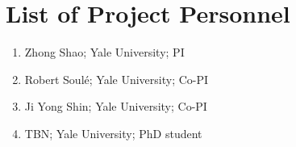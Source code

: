 \documentclass[12pt]{article}
\begin{document}
\thispagestyle{empty}

\section*{List of Project Personnel}

\begin{enumerate}
\item Zhong Shao; Yale University; PI
\item Robert Soul\'e; Yale University; Co-PI
\item Ji Yong Shin; Yale University; Co-PI
\item TBN; Yale University; PhD student
\end{enumerate}
\end{document}
